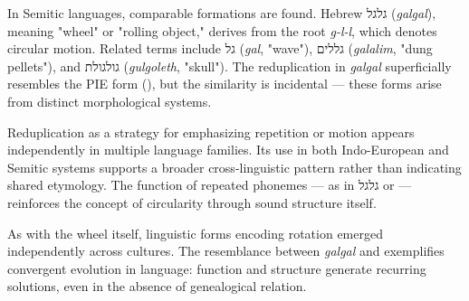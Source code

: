 In Semitic languages, comparable formations are found. Hebrew \texthebrew{גלגל} (\emph{galgal}), meaning "wheel" or "rolling object," derives from the root \emph{g-l-l}, which denotes circular motion. Related terms include \texthebrew{גל} (\emph{gal}, "wave"), \texthebrew{גללים} (\emph{galalim}, "dung pellets"), and \texthebrew{גולגולת} (\emph{gulgoleth}, "skull"). The reduplication in \emph{galgal} superficially resembles the PIE form  (), but the similarity is incidental — these forms arise from distinct morphological systems.

Reduplication as a strategy for emphasizing repetition or motion appears independently in multiple language families. Its use in both Indo-European and Semitic systems supports a broader cross-linguistic pattern rather than indicating shared etymology. The function of repeated phonemes — as in \texthebrew{גלגל} or  — reinforces the concept of circularity through sound structure itself.

As with the wheel itself, linguistic forms encoding rotation emerged independently across cultures. The resemblance between \emph{galgal} and  exemplifies convergent evolution in language: function and structure generate recurring solutions, even in the absence of genealogical relation.

